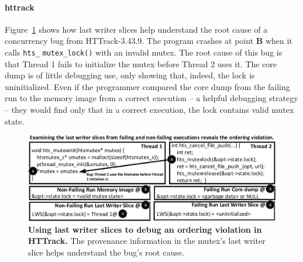 \documentclass[10pt,nocopyrightspace]{sigplanconf}
\newcommand{\Caption}[1]{\begin{minipage}{.95\columnwidth} \caption{#1} \end{minipage} \vspace{-1.2ex}}
\begin{document}
%


\paragraph{httrack}
Figure~\ref{fig:httlws} shows how last writer slices help understand the root
cause of a concurrency bug from HTTrack-3.43.9.  The program crashes at point
{\bf B} when it calls {\tt hts\_} {\tt mutex\_lock()} with an invalid mutex.    The
root cause of this bug is that Thread 1 fails to initialize the mutex before
Thread 2 uses it.   The core dump is of little debugging use, only showing
that, indeed, the lock is uninitialized.  Even if the programmer compared the
core dump from the failing run to the memory image from a correct execution --
a helpful debugging strategy -- they would find only that in a correct
execution, the lock contains valid mutex state.

\begin{figure}[h]
\centering
\includegraphics[width=\columnwidth]{figs/LWSHTTDebug.pdf}
\Caption{\label{fig:httlws}{\bf Using last writer slices to debug an
ordering violation in HTTrack.} The provenance information in the mutex's last
writer slice helps understand the bug's root cause.}
\end{figure}
\end{document}
